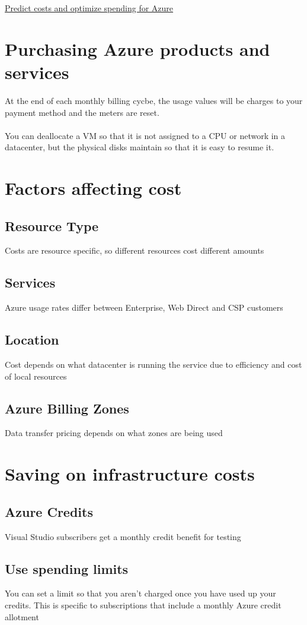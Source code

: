 \documentclass{article}[18pt]
\begin{document}
\begin{center}
\underline{\huge Predict costs and optimize spending for Azure}
\end{center}
\section{Purchasing Azure products and services}

At the end of each monthly billing cycbe, the usage values will be charges to your payment method and the meters are reset.\\
\\
You can deallocate a VM so that it is not assigned to a CPU or network in a datacenter, but the physical disks maintain so that it is easy to resume it.
\section{Factors affecting cost}
\subsection{Resource Type}
Costs are resource specific, so different resources cost different amounts
\subsection{Services}
Azure usage rates differ between Enterprise, Web Direct and CSP customers
\subsection{Location}
Cost depends on what datacenter is running the service due to efficiency and cost of local resources
\subsection{Azure Billing Zones}
Data transfer pricing depends on what zones are being used
\section{Saving on infrastructure costs}
\subsection{Azure Credits}
Visual Studio subscribers get a monthly credit benefit for testing
\subsection{Use spending limits}
You can set a limit so that you aren't charged once you have used up your credits. This is specific to subscriptions that include a monthly Azure credit allotment
\end{document}
